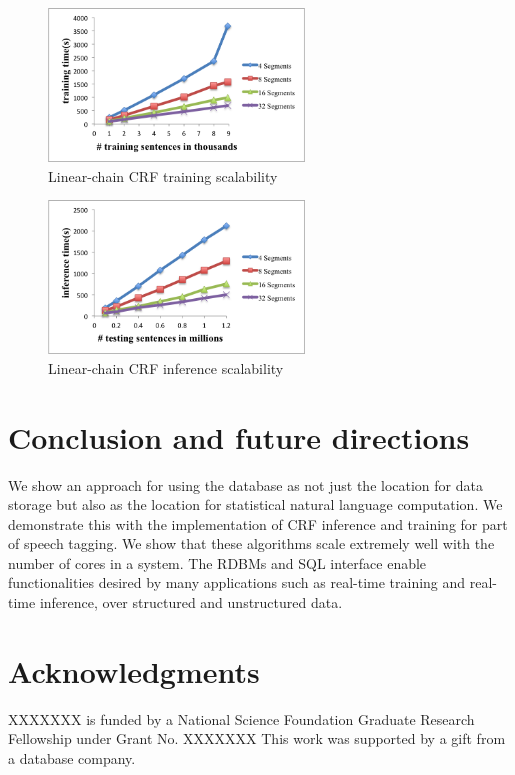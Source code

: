 \documentclass[11pt,letterpaper]{article}
\begin{document}
\begin{figure}
\centering
\includegraphics[height=11em]{training}
\caption{Linear-chain CRF training scalability}
\label{fig:crftrain}
\end{figure}

\begin{figure}
\centering
\includegraphics[height=11em]{testing}
\caption{Linear-chain CRF inference scalability}
\label{fig:crftest}
\end{figure}


\section{Conclusion and future directions}
We show an approach for using the database as not just the location for
data storage but also as the location for statistical natural language 
computation.
We demonstrate this with the implementation of CRF inference and training 
for part of speech tagging.
We show that these algorithms scale extremely well with the number of cores
in a system.
The RDBMs and SQL interface enable functionalities desired by many 
applications such as real-time training and real-time inference, over
structured and unstructured data.




\section*{Acknowledgments}
XXXXXXX is funded by a National
Science Foundation Graduate Research Fellowship under Grant No. XXXXXXX %
This work was supported by a gift from a database company. %


%

\end{document}
